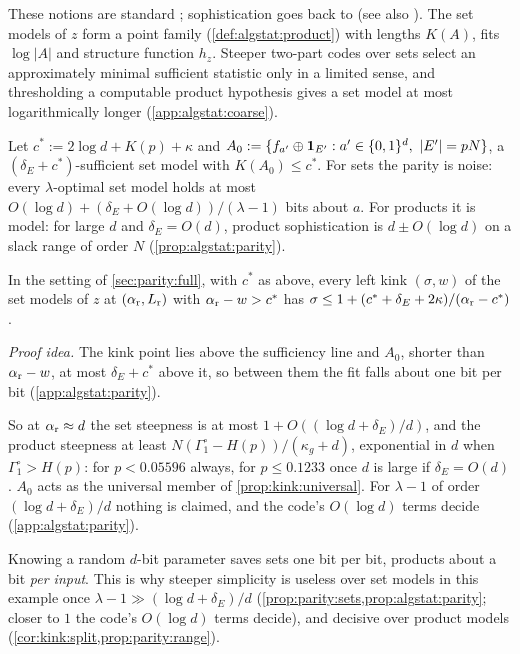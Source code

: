 These notions are standard \citep{gacs2001algorithmic,vereshchagin2004kolmogorov,vereshchagin2017algorithmic}; sophistication goes back to \citet{koppel1987complexity,koppel1991almost} (see also \citealp{vitanyi2006meaningful,antunes2009sophistication}). The set models of $z$ form a point family (\cref{def:algstat:product}) with lengths $K(A)$, fits $\log|A|$ and structure function $h_z$. Steeper two-part codes over sets select an approximately minimal sufficient statistic only in a limited sense, and thresholding a computable product hypothesis gives a set model at most logarithmically longer (\cref{app:algstat:coarse}).

Let $c^*:=2\log d+K(p)+\kappa$ and $A_0:=\{f_{a'}\oplus\ind_{E'}:a'\in\{0,1\}^d,\ |E'|=pN\}$, a $(\delta_E+c^*)$-sufficient set model with $K(A_0)\le c^*$. For sets the parity is noise: every $\lambda$-optimal set model holds at most $O(\log d)+(\delta_E+O(\log d))/(\lambda-1)$ bits about $a$. For products it is model: for large $d$ and $\delta_E=O(d)$, product sophistication is $d\pm O(\log d)$ on a slack range of order $N$ (\cref{prop:algstat:parity}).

\begin{proposition}\label{prop:parity:sets}
In the setting of \cref{sec:parity:full}, with $c^*$ as above, every left kink $(\sigma,w)$ of the set models of $z$ at $(\alpha_{\rm r},L_{\rm r})$ with $\alpha_{\rm r}-w>c^*$ has $\sigma\le1+(c^*+\delta_E+2\kappa)/(\alpha_{\rm r}-c^*)$.
\end{proposition}

\emph{Proof idea.} The kink point lies above the sufficiency line and $A_0$, shorter than $\alpha_{\rm r}-w$, at most $\delta_E+c^*$ above it, so between them the fit falls about one bit per bit (\cref{app:algstat:parity}).

So at $\alpha_{\rm r}\approx d$ the set steepness is at most $1+O((\log d+\delta_E)/d)$, and the product steepness at least $N(\Gamma^\circ_1-H(p))/(\kappa_g+d)$, exponential in $d$ when $\Gamma^\circ_1>H(p)$: for $p<0.05596$ always, for $p\le0.1233$ once $d$ is large if $\delta_E=O(d)$. $A_0$ acts as the universal member of \cref{prop:kink:universal}. For $\lambda-1$ of order $(\log d+\delta_E)/d$ nothing is claimed, and the code's $O(\log d)$ terms decide (\cref{app:algstat:parity}).

\begin{remark}\label{rem:algstat:reading}
Knowing a random $d$-bit parameter saves sets one bit per bit, products about a bit \emph{per input}. This is why steeper simplicity is useless over set models in this example once $\lambda-1\gg(\log d+\delta_E)/d$ (\cref{prop:parity:sets,prop:algstat:parity}; closer to $1$ the code's $O(\log d)$ terms decide), and decisive over product models (\cref{cor:kink:split,prop:parity:range}).
\end{remark}

